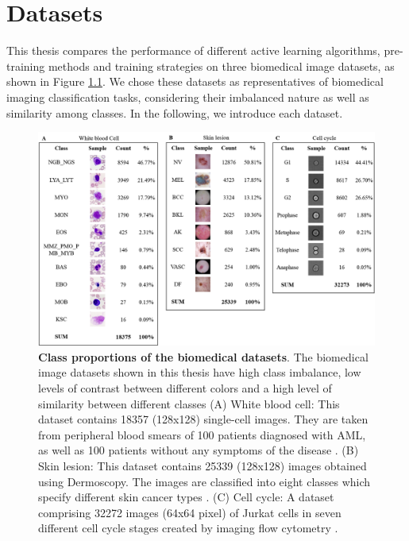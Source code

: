 
\chapter{Datasets}\label{chapter:datasets}
This thesis compares the performance of different active learning algorithms, pre-training methods and training strategies on three biomedical image datasets, as shown in Figure \ref{fig:datasets_composition}. We chose these datasets as representatives of biomedical imaging classification tasks, considering their imbalanced nature as well as similarity among classes. In the following, we introduce each dataset.

\begin{figure}[htbp]
\centering
\captionsetup{format=plain}
\includegraphics[width=\textwidth]{figures/fig_datasets_composition.png}
\caption[Class proportions of the biomedical datasets]{\textbf{Class proportions of the biomedical datasets}. The biomedical image datasets shown in this thesis have high class imbalance, low levels of contrast between different colors and a high level of similarity between different classes (A) White blood cell: This dataset contains 18357 (128x128) single-cell images. They are taken from peripheral blood smears of 100 patients diagnosed with AML, as well as 100 patients without any symptoms of the disease \cite{matek2019, clark2013}. (B) Skin lesion: This dataset contains 25339 (128x128) images obtained using Dermoscopy. The images are classified into eight classes which specify different skin cancer types \cite{codella2018, combalia2019, tschandl2018}. (C) Cell cycle: A dataset comprising 32272 images (64x64 pixel) of Jurkat cells in seven different cell cycle stages created by imaging flow cytometry \cite{eulenberg2017}.}
\label{fig:datasets_composition}
\end{figure}

